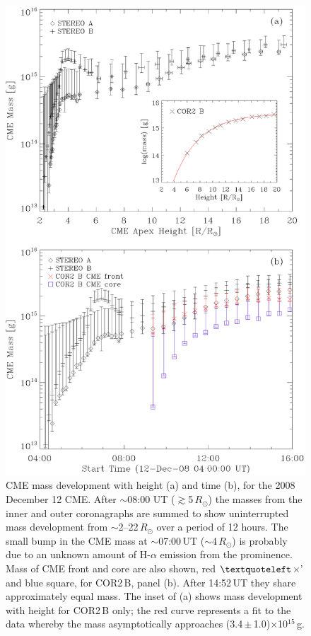\documentclass{emulateapj}
\begin{document}
\begin{figure}
\includegraphics[scale=0.55, angle=0]{20081212_mass_ht.eps}
\caption{CME mass development with height (a) and time (b), for the 2008 December 12 CME. After $\sim$08:00 UT ($\gtrsim$5\,$R_{\odot}$) the masses from the inner and outer coronagraphs are summed to show uninterrupted 
mass development from $\sim$2--22\,$R_{\odot}$ over a period of 12 hours. The small bump in the 
CME mass at $\sim$07:00\,UT ($\sim$4\,$R_{\odot}$) is probably due to an unknown amount of H-$\alpha$ emission from the prominence. Mass of CME front and core are also shown, red $\textquoteleft$$\times$' and blue square, for COR2\,B, panel (b). After 14:52\,UT they share approximately equal mass. The inset of (a) shows mass development with height for COR2\,B only; the red curve represents a fit to the data whereby the mass asymptotically approaches (3.4\,$\pm$\,1.0)$\times$10$^{15}$\,g. }
\label{fig:plotc}
\end{figure}
\end{document}
